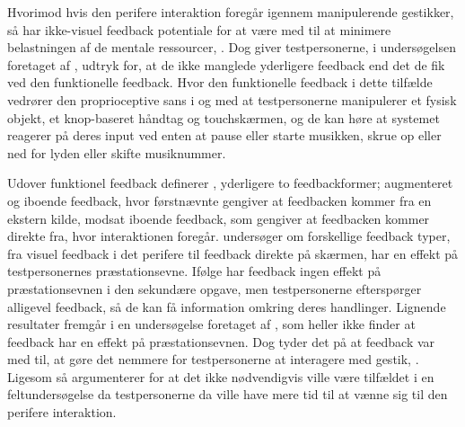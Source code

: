 Hvorimod hvis den perifere interaktion foregår igennem manipulerende gestikker, så har ikke-visuel feedback potentiale for at være med til at minimere belastningen af de mentale ressourcer, \parencite[s. 3]{PDF:FacilitatingPIDesignAndEvaluation}. Dog giver testpersonerne, i undersøgelsen foretaget af \textcite[s. 173]{PDF:ComparingInputModalities}, udtryk for, at de ikke manglede yderligere feedback end det de fik ved den funktionelle feedback. Hvor den funktionelle feedback i dette tilfælde vedrører den proprioceptive sans i og med at testpersonerne manipulerer et fysisk objekt, et knop-baseret håndtag og touchskærmen, og de kan høre at systemet reagerer på deres input ved enten at pause eller starte musikken, skrue op eller ned for lyden eller skifte musiknummer.

Udover funktionel feedback definerer \textcite[s. 3]{PDF:InteractionFrogger}, yderligere to feedbackformer; augmenteret og iboende feedback, hvor førstnævnte gengiver at feedbacken kommer fra en ekstern kilde, modsat iboende feedback, som gengiver at feedbacken kommer direkte fra, hvor interaktionen foregår. \blankline
%
\textcite[ss. 1263-1268]{PDF:ComparingModFeedback} undersøger om forskellige feedback typer, fra visuel feedback i det perifere til feedback direkte på skærmen, har en effekt på testpersonernes præstationsevne. Ifølge \textcite[ss. 1267-1268]{PDF:ComparingModFeedback} har feedback ingen effekt på præstationsevnen i den sekundære opgave, men testpersonerne efterspørger alligevel feedback, så de kan få information omkring deres handlinger. Lignende resultater fremgår i en undersøgelse foretaget af \textcite[s. 8]{PDF:DoThatThere}, som heller ikke finder at feedback har en effekt på præstationsevnen. Dog tyder det på at feedback var med til, at gøre det nemmere for testpersonerne at interagere med gestik, \parencite[s. 8]{PDF:DoThatThere}. Ligesom \textcite[s. 174]{PDF:ComparingInputModalities} så argumenterer \textcite[s. 1268]{PDF:ComparingModFeedback} for at det ikke nødvendigvis ville være tilfældet i en feltundersøgelse da testpersonerne da ville have mere tid til at vænne sig til den perifere interaktion. 

